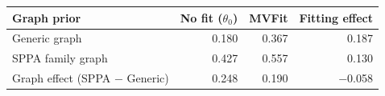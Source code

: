 \begin{tabular}{@{}lrrr@{}}
\toprule
Graph prior & No fit ($\theta_0$) & MVFit & Fitting effect \\
\midrule
Generic graph & 0.180 & 0.367 & 0.187 \\
SPPA family graph & 0.427 & 0.557 & 0.130 \\
\midrule
Graph effect (SPPA $-$ Generic) & 0.248 & 0.190 & $-$0.058 \\
\bottomrule
\end{tabular}
